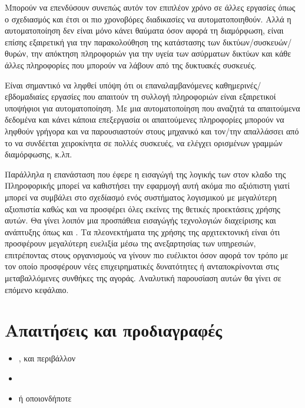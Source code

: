 Μπορούν να επενδύσουν συνεπώς αυτόν τον επιπλέον χρόνο σε άλλες εργασίες όπως ο σχεδιασμός και έτσι οι πιο χρονοβόρες διαδικασίες να αυτοματοποιηθούν. Αλλά η αυτοματοποίηση δεν είναι μόνο
κάνει θαύματα όσον αφορά τη διαμόρφωση, είναι επίσης εξαιρετική για την παρακολούθηση της κατάστασης των δικτύων/συσκευών/θυρών, την απόκτηση πληροφοριών για την υγεία των ασύρματων δικτύων και κάθε
άλλες πληροφορίες που μπορούν να λάβουν από της δυκτυακές συσκευές.

Είναι σημαντικό να ληφθεί υπόψη ότι οι επαναλαμβανόμενες καθημερινές/εβδομαδιαίες εργασίες
που απαιτούν τη συλλογή πληροφοριών είναι εξαιρετικοί υποψήφιοι για αυτοματοποίηση.
Με μια αυτοματοποίηση που αναζητά τα απαιτούμενα δεδομένα και κάνει κάποια επεξεργασία οι απαιτούμενες πληροφορίες μπορούν να ληφθούν γρήγορα και να παρουσιαστούν στους
μηχανικό και τον/την απαλλάσσει από το να συνδέεται χειροκίνητα σε πολλές συσκευές, να ελέγχει
ορισμένων γραμμών διαμόρφωσης, κ.λπ.

Παράλληλα η επανάσταση που έφερε η εισαγώγή της λογικής των  στον κλαδο της Πληροφορικής μπορεί να καθιστήσει την εφαρμογή αυτή ακόμα πιο αξιόπιστη
γιατί μπορεί να συμβάλει στο σχεδίασμό ενός συστήματος λογισμικού με μεγαλύτερη αξιοπιστία καθώς και να προσφέρει όλες εκείνες της θετικές προεκτάσεις χρήσης αυτών.
Θα γίνει λοιπόν μια προσπάθεια εισαγώγής τεχνολογιών διαχείρισης και ανάπτυξης  όπως  και . Τα πλεονεκτήματα της χρήσης της αρχιτεκτονική  είναι ότι προσφέρουν μεγαλύτερη ευελιξία 
μέσω της ανεξαρτησίας των υπηρεσιών, επιτρέποντας στους οργανισμούς να γίνουν πιο ευέλικτοι όσον αφορά τον τρόπο με τον οποίο προσφέρουν νέες επιχειρηματικές δυνατότητες ή ανταποκρίνονται στις μεταβαλλόμενες συνθήκες της αγοράς. Αναλυτική παρουσίαση αυτών θα γίνει σε επόμενο κεφάλαιο. 


\section{Απαιτήσεις και προδιαγραφές}
\begin{itemize}
    \item {} ,  και  περιβάλλον
    \item {}
    \item {} ή οποιονδήποτε 
\end{itemize}





